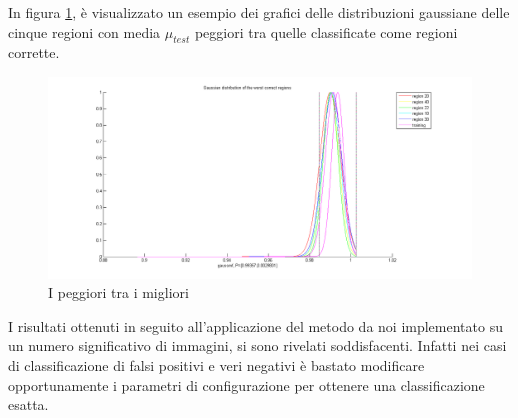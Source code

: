 In figura \ref{fig:worstBestGraph}, è visualizzato un esempio dei grafici delle distribuzioni gaussiane delle cinque regioni con media $\mu_{test}$ peggiori tra quelle classificate come regioni corrette.


\begin{figure}[ht]
\begin{center}
\includegraphics[width=1\textwidth]{img/worst_best_graph}
\caption{ I peggiori tra i migliori }
\label{fig:worstBestGraph}
\end{center}
\end{figure}

I risultati ottenuti in seguito all'applicazione del metodo da noi implementato su un numero significativo di immagini, si sono rivelati soddisfacenti. Infatti nei casi di classificazione di falsi positivi e veri negativi è bastato modificare opportunamente i parametri di configurazione per ottenere una classificazione esatta.